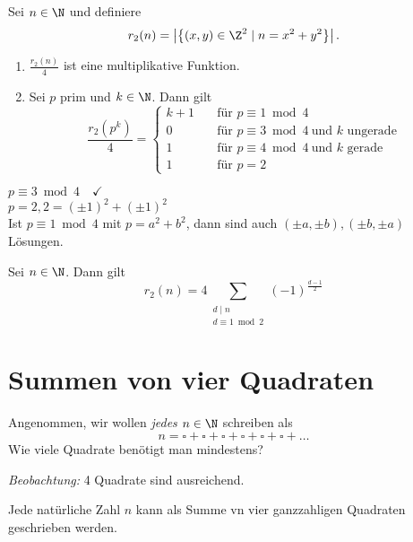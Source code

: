\begin{thm}\autolabel
	Sei $n \in \N$ und definiere
	\[ r_2(n) = \left| \left\{ (x,y) \in \Z^2 \mid n = x^2 + y^2 \right\} \right|. \]
	\begin{enumerate}[label={\roman*})]
		\item $\frac{r_2(n)}{4}$ ist eine multiplikative Funktion.
		\item Sei $p$ prim und $k \in \N$. Dann gilt
			\[ \frac{r_2(p^k)}{4} = \begin{cases}
				k+1 \quad &\text{für } p \equiv 1 \bmod 4\\
				0 \quad &\text{für } p \equiv 3 \bmod 4 \ \text{und $k$ ungerade}\\
				1 \quad &\text{für } p \equiv 4 \bmod 4 \ \text{und $k$ gerade}\\
				1 \quad &\text{für } p = 2
			\end{cases} \]
	\end{enumerate}
\end{thm}

\begin{exmp*}
	$p \equiv 3 \bmod 4 \quad \checkmark$\\
	$p = 2, 2 = (\pm 1)^2 + (\pm 1)^2$\\
	Ist $p \equiv 1 \bmod 4$ mit $p = a^2+b^2$, dann sind auch $(\pm a,\pm b),(\pm b, \pm a)$ Lösungen.
\end{exmp*}

\begin{thm}[Dirichlet]\autolabel
	Sei $n \in \N$. Dann gilt
	\[ r_2(n) = 4 \sum_{\substack{d \mid n \\ d \equiv 1 \bmod 2}} (-1)^{\frac{d-1}{2}} \]
\end{thm}

\section{Summen von vier Quadraten}

\begin{frage*}
	Angenommen, wir wollen \emph{jedes} $n \in \N$ schreiben als
	\[ n = \square + \square + \square + \square + \square + \square + \dots \]
	Wie viele Quadrate benötigt man mindestens?
\end{frage*}

\emph{Beobachtung:} 4 Quadrate sind ausreichend.

\begin{thm}\autolabel
	Jede natürliche Zahl $n$ kann als Summe vn vier ganzzahligen Quadraten geschrieben werden.
\end{thm}

